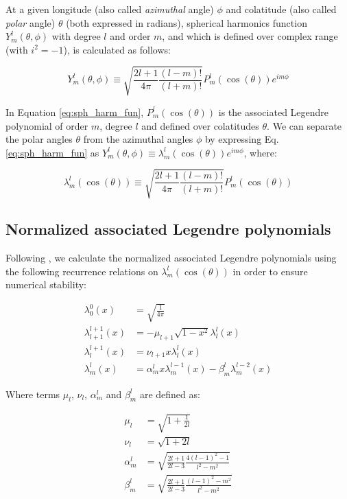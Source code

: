\documentclass[11pt, a4paper, logo, copyright, numbering]{googledeepmind}
\begin{document}
At a given longitude (also called \emph{azimuthal} angle) $\phi$ and colatitude (also called \emph{polar} angle) $\theta$ (both expressed in radians), spherical harmonics function $Y_m^l(\theta, \phi)$ with degree $l$ and order $m$, and which is defined over complex range (with $i^2=-1$), is calculated as follows:

\begin{equation}
Y_m^l(\theta, \phi) \equiv \sqrt{\frac{2l+1}{4\pi} \frac{(l-m)!}{(l+m)!}}
 P_m^l(\cos(\theta))e^{im\phi}
\label{eq:sph_harm_fun}
\end{equation}

In Equation \ref{eq:sph_harm_fun}, $P_m^l(\cos(\theta))$ is the associated Legendre polynomial of order $m$, degree $l$ and defined over colatitudes $\theta$. We can separate the polar angles $\theta$ from the azimuthal angles $\phi$ by expressing Eq. \ref{eq:sph_harm_fun} as $Y_m^l(\theta, \phi) \equiv \lambda_m^l(\cos(\theta))e^{im\phi}$, where:

\begin{equation}
\lambda_m^l(\cos(\theta)) \equiv \sqrt{\frac{2l+1}{4\pi} \frac{(l-m)!}{(l+m)!}} P_m^l(\cos(\theta))
\label{eq:sph_harm_lambda}
\end{equation}

\subsection{Normalized associated Legendre polynomials}

Following \citet{willmert2020notes,willmert2019constraining}, we calculate the normalized associated Legendre polynomials using the following recurrence relations on $\lambda_m^l(\cos(\theta))$ in order to ensure numerical stability:

\begin{align}
\lambda_0^0(x) &=  \sqrt{\frac{1}{4\pi}} \\
\lambda_{l+1}^{l+1}(x) &= -\mu_{l+1} \sqrt{1-x^2}\lambda_l^l(x) \\
\lambda_l^{l+1}(x) &= \nu_{l+1} x \lambda_l^l(x) \\
\lambda_m^l(x) &= \alpha_m^l x \lambda_m^{l-1}(x) - \beta_m^l\lambda_m^{l-2}(x)
\end{align}

Where terms $\mu_l$, $\nu_l$, $\alpha_m^l$ and $\beta_m^l$ are defined as:

\begin{align}
\mu_l &= \sqrt{1 + \frac{1}{2l}} \\
\nu_l &= \sqrt{1+2l} \\
\alpha_m^l &= \sqrt{\frac{2l+1}{2l-3}\frac{4(l-1)^2-1}{l^2 - m^2}} \\
\beta_m^l &= \sqrt{\frac{2l+1}{2l-3}\frac{(l-1)^2-m^2}{l^2 - m^2}}
\end{align}
\end{document}
